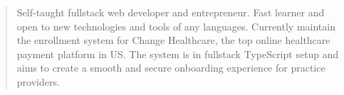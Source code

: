 \documentclass[10pt,a4paper,ragged2e,withhyper]{altacv}
\begin{document}
\begin{paracol}{2}
        
        
        \newpage
        
        \switchcolumn
        
            \begin{quote}
                Self-taught fullstack web developer and entrepreneur. Fast learner and open to new technologies and tools of any languages. Currently maintain the enrollment system for Change Healthcare, the top online healthcare payment platform in US. The system is in fullstack TypeScript setup and aims to create a smooth and secure onboarding experience for practice providers.
            \end{quote}
        

\end{paracol}
\end{document}
